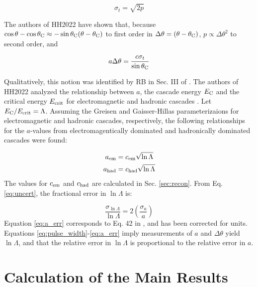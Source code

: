 \documentclass[amsmath,amssymb,aps,prd,10pt,twocolumn,showkeys]{revtex4}
\begin{document}
\begin{equation}
\sigma_t = \sqrt{2p} \label{eq:pulse_width}
\end{equation}

The authors of HH2022 have shown that, because $\cos\theta - \cos\theta_{\rm C} \approx -\sin\theta_{\rm C}(\theta-\theta_{\rm C})$ to first order in $\Delta\theta=(\theta-\theta_{\rm C})$, $p \propto \Delta\theta^2$ to second order, and 

\begin{equation}
a\Delta\theta = \frac{c \sigma_t}{\sin\theta_{\rm C}} \label{eq:uncert}
\end{equation}

Qualitatively, this notion was identified by RB in Sec. III of \cite{10.1103/physrevd.65.016003}.  The authors of HH2022 analyzed the relationship between $a$, the cascade energy $E_{\rm C}$ and the critical energy $E_{\rm crit}$ for electromagnetic and hadronic cascades \cite{PhysRevD.105.123019}.  Let $E_{\rm C}/E_{\rm crit} = \Lambda$.  Assuming the Greisen and Gaisser-Hillas parameterizaions for electromagnetic and hadronic cascades, respectively, the following relationships for the $a$-values from electromagentically dominated and hadronically dominated cascades were found:

\begin{align}
a_{\rm em} &= c_{\rm em} \sqrt{\ln\Lambda} \label{eq:em} \\
a_{\rm had} &= c_{\rm had} \sqrt{\ln\Lambda} \label{eq:had}
\end{align}
\noindent
The values for $c_{\rm em}$ and $c_{\rm had}$ are calculated in Sec. \ref{sec:recon}. From Eq. \ref{eq:uncert}, the fractional error in $\ln\Lambda$ is:

\begin{equation}
\frac{\sigma_{\ln\Lambda}}{\ln\Lambda} = 2\left(\frac{\sigma_a}{a}\right) \label{eq:a_err}
\end{equation}
\noindent
Equation \ref{eq:a_err} corresponds to Eq. 42 in \cite{PhysRevD.105.123019}, and has been corrected for units.  Equations \ref{eq:pulse_width}-\ref{eq:a_err} imply measurements of $a$ and $\Delta\theta$ yield $\ln\Lambda$, and that the relative error in $\ln\Lambda$ is proportional to the relative error in $a$.

\section{Calculation of the Main Results}
\label{sec:onc}
\end{document}
